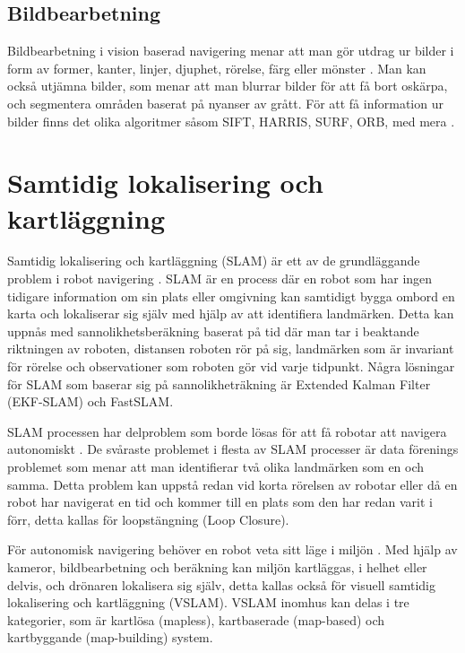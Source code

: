 \section{Bildbearbetning}

Bildbearbetning i vision baserad navigering menar att man gör utdrag ur bilder i form av former, kanter, linjer, djuphet, rörelse, färg eller mönster \citep{982903}. Man kan också utjämna bilder, som menar att man blurrar bilder för att få bort oskärpa, och segmentera områden baserat på nyanser av grått. För att få information ur bilder finns det olika algoritmer såsom SIFT, HARRIS, SURF, ORB, med mera \citep{8930783, slamproblem, mapbuildingsift}.

\chapter{Samtidig lokalisering och kartläggning}

Samtidig lokalisering och kartläggning (SLAM) är ett av de grundläggande problem i robot navigering \citep{realslamproblem}. SLAM är en process där en robot som har ingen tidigare information om sin plats eller omgivning kan samtidigt bygga ombord en karta och lokaliserar sig själv med hjälp av att identifiera landmärken. Detta kan uppnås med sannolikhetsberäkning baserat på tid där man tar i beaktande riktningen av roboten, distansen roboten rör på sig, landmärken som är invariant för rörelse och observationer som roboten gör vid varje tidpunkt. Några lösningar för SLAM som baserar sig på sannolikheträkning är Extended Kalman Filter (EKF-SLAM) och FastSLAM. 

SLAM processen har delproblem som borde lösas för att få robotar att navigera autonomiskt \citep{slamproblem}. De svåraste problemet i flesta av SLAM processer är data förenings problemet som menar att man identifierar två olika landmärken som en och samma. Detta problem kan uppstå redan vid korta rörelsen av robotar eller då en robot har navigerat en tid och kommer till en plats som den har redan varit i förr, detta kallas för loopstängning (Loop Closure). 

För autonomisk navigering behöver en robot veta sitt läge i miljön \citep{geospatial}. Med hjälp av kameror, bildbearbetning och beräkning kan miljön kartläggas, i helhet eller delvis, och drönaren lokalisera sig själv, detta kallas också för visuell samtidig lokalisering och kartläggning (VSLAM). VSLAM inomhus kan delas i tre kategorier, som är kartlösa (mapless), kartbaserade (map-based) och kartbyggande (map-building) system. 

